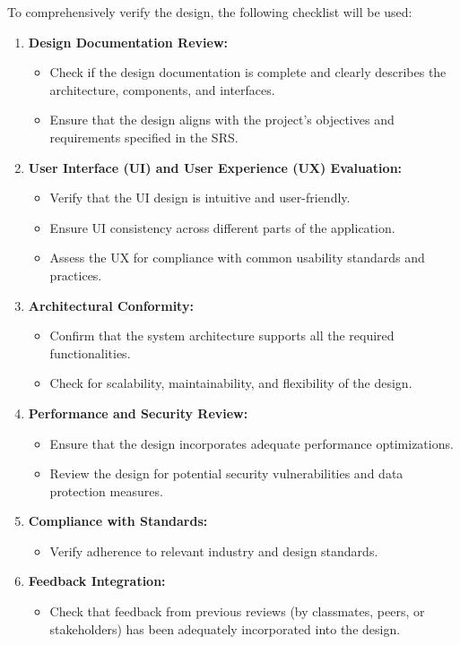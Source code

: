 \documentclass[12pt, titlepage]{article}
\begin{document}
To comprehensively verify the design, the following checklist will be used:

\begin{enumerate}
    \item \textbf{Design Documentation Review:}
    \begin{itemize}
        \item Check if the design documentation is complete and clearly describes the architecture, components, and interfaces.
        \item Ensure that the design aligns with the project's objectives and requirements specified in the SRS.
    \end{itemize}
    
    \item \textbf{User Interface (UI) and User Experience (UX) Evaluation:}
    \begin{itemize}
        \item Verify that the UI design is intuitive and user-friendly.
        \item Ensure UI consistency across different parts of the application.
        \item Assess the UX for compliance with common usability standards and practices.
    \end{itemize}

    \item \textbf{Architectural Conformity:}
    \begin{itemize}
        \item Confirm that the system architecture supports all the required functionalities.
        \item Check for scalability, maintainability, and flexibility of the design.
    \end{itemize}

    \item \textbf{Performance and Security Review:}
    \begin{itemize}
        \item Ensure that the design incorporates adequate performance optimizations.
        \item Review the design for potential security vulnerabilities and data protection measures.
    \end{itemize}

    \item \textbf{Compliance with Standards:}
    \begin{itemize}
        \item Verify adherence to relevant industry and design standards.
    \end{itemize}

    \item \textbf{Feedback Integration:}
    \begin{itemize}
        \item Check that feedback from previous reviews (by classmates, peers, or stakeholders) has been adequately incorporated into the design.
    \end{itemize}
\end{enumerate}
\end{document}
